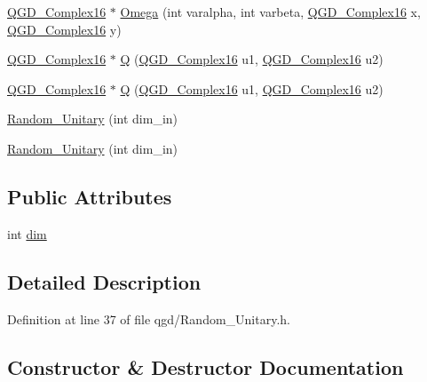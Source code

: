\begin{DoxyCompactItemize}
\hyperlink{struct_q_g_d___complex16}{Q\+G\+D\+\_\+\+Complex16} $\ast$ \hyperlink{class_random___unitary_af4675568a9052db352b6beba6d319ab2}{Omega} (int varalpha, int varbeta, \hyperlink{struct_q_g_d___complex16}{Q\+G\+D\+\_\+\+Complex16} x, \hyperlink{struct_q_g_d___complex16}{Q\+G\+D\+\_\+\+Complex16} y)
\item 
\hyperlink{struct_q_g_d___complex16}{Q\+G\+D\+\_\+\+Complex16} $\ast$ \hyperlink{class_random___unitary_a8ac4986bebf98c3ef790937834388c01}{Q} (\hyperlink{struct_q_g_d___complex16}{Q\+G\+D\+\_\+\+Complex16} u1, \hyperlink{struct_q_g_d___complex16}{Q\+G\+D\+\_\+\+Complex16} u2)
\item 
\hyperlink{struct_q_g_d___complex16}{Q\+G\+D\+\_\+\+Complex16} $\ast$ \hyperlink{class_random___unitary_ab3637c7e026793b579119289dbbf4269}{Q} (\hyperlink{struct_q_g_d___complex16}{Q\+G\+D\+\_\+\+Complex16} u1, \hyperlink{struct_q_g_d___complex16}{Q\+G\+D\+\_\+\+Complex16} u2)
\item 
\hyperlink{class_random___unitary_abe3761f23489a4147f0f1ebbb3bb8b9f}{Random\+\_\+\+Unitary} (int dim\+\_\+in)
\item 
\hyperlink{class_random___unitary_abe3761f23489a4147f0f1ebbb3bb8b9f}{Random\+\_\+\+Unitary} (int dim\+\_\+in)
\end{DoxyCompactItemize}
\subsection*{Public Attributes}
\begin{DoxyCompactItemize}
\item 
int \hyperlink{class_random___unitary_a8988de68bf439f8ff5a44d90992ea97e}{dim}
\end{DoxyCompactItemize}


\subsection{Detailed Description}


Definition at line 37 of file qgd/\+Random\+\_\+\+Unitary.\+h.



\subsection{Constructor \& Destructor Documentation}
